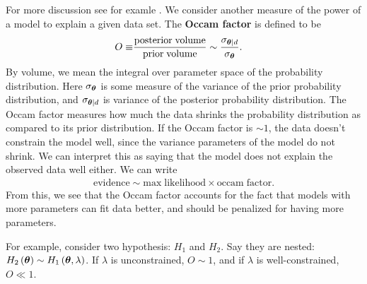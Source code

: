 For more discussion see for examle \cite{Mackay-information-theory-book}.
We consider another measure of the power of a model to explain a given data set.
The \textbf{Occam factor} is defined to be
\begin{align}
    O
    \equiv&
    \frac{\mathrm{posterior\; volume}}{\mathrm{prior\; volume}}
    \sim 
    \frac{\sigma_{{\bm \theta}|d}}{\sigma_{{\bm \theta}}}
    .
\end{align}
By volume, we mean the integral over parameter space of the
probability distribution.
Here $\sigma_{{\bm \theta}}$ is some measure of the variance of the
prior probability distribution, and $\sigma_{{\bm \theta}|d}$ is variance
of the posterior probability distribution.
The Occam factor measures how much the data shrinks the probability
distribution as compared to its prior distribution.
If the Occam factor is $\sim 1$, the data doesn't constrain
the model well, since the variance parameters of the model do not shrink.
We can interpret this as saying that the model does not explain the 
observed data well either.
We can write
\begin{align}
    \mathrm{evidence}
    \sim
    \mathrm{max\;likelihood}
    \times
    \mathrm{occam\; factor}
    .
\end{align}
From this, we see that 
the Occam factor accounts for the fact that models with more parameters
can fit data better, and should be penalized for having more parameters.

For example, consider two hypothesis: $H_1$ and $H_2$.
Say they are nested: $H_2\left({\bm \theta}\right) \sim H_1\left({\bm \theta},\lambda\right)$.
If $\lambda$ is unconstrained, $O\sim 1$, and if $\lambda$ is well-constrained,
$O\ll1$.

